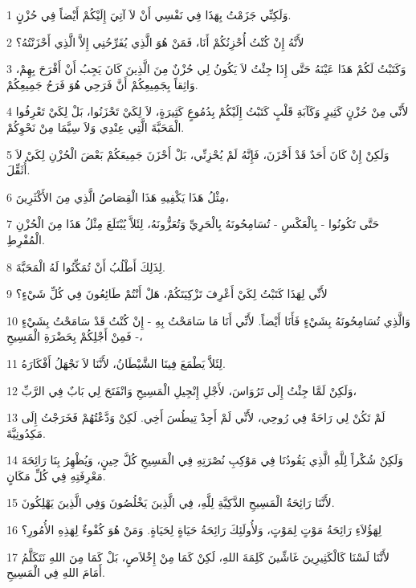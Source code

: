 \par 1 وَلَكِنِّي جَزَمْتُ بِهَذَا فِي نَفْسِي أَنْ لاَ آتِيَ إِلَيْكُمْ أَيْضاً فِي حُزْنٍ.
\par 2 لأَنَّهُ إِنْ كُنْتُ أُحْزِنُكُمْ أَنَا، فَمَنْ هُوَ الَّذِي يُفَرِّحُنِي إِلاَّ الَّذِي أَحْزَنْتُهُ؟
\par 3 وَكَتَبْتُ لَكُمْ هَذَا عَيْنَهُ حَتَّى إِذَا جِئْتُ لاَ يَكُونُ لِي حُزْنٌ مِنَ الَّذِينَ كَانَ يَجِبُ أَنْ أَفْرَحَ بِهِمْ، وَاثِقاً بِجَمِيعِكُمْ أَنَّ فَرَحِي هُوَ فَرَحُ جَمِيعِكُمْ.
\par 4 لأَنِّي مِنْ حُزْنٍ كَثِيرٍ وَكَآبَةِ قَلْبٍ كَتَبْتُ إِلَيْكُمْ بِدُمُوعٍ كَثِيرَةٍ، لاَ لِكَيْ تَحْزَنُوا، بَلْ لِكَيْ تَعْرِفُوا الْمَحَبَّةَ الَّتِي عِنْدِي وَلاَ سِيَّمَا مِنْ نَحْوِكُمْ.
\par 5 وَلَكِنْ إِنْ كَانَ أَحَدٌ قَدْ أَحْزَنَ، فَإِنَّهُ لَمْ يُحْزِنِّي، بَلْ أَحْزَنَ جَمِيعَكُمْ بَعْضَ الْحُزْنِ لِكَيْ لاَ أُثَقِّلَ.
\par 6 مِثْلُ هَذَا يَكْفِيهِ هَذَا الْقِصَاصُ الَّذِي مِنَ الأَكْثَرِينَ،
\par 7 حَتَّى تَكُونُوا - بِالْعَكْسِ - تُسَامِحُونَهُ بِالْحَرِيِّ وَتُعَزُّونَهُ، لِئَلاَّ يُبْتَلَعَ مِثْلُ هَذَا مِنَ الْحُزْنِ الْمُفْرِطِ.
\par 8 لِذَلِكَ أَطْلُبُ أَنْ تُمَكِّنُوا لَهُ الْمَحَبَّةَ.
\par 9 لأَنِّي لِهَذَا كَتَبْتُ لِكَيْ أَعْرِفَ تَزْكِيَتَكُمْ، هَلْ أَنْتُمْ طَائِعُونَ فِي كُلِّ شَيْءٍ؟
\par 10 وَالَّذِي تُسَامِحُونَهُ بِشَيْءٍ فَأَنَا أَيْضاً. لأَنِّي أَنَا مَا سَامَحْتُ بِهِ - إِنْ كُنْتُ قَدْ سَامَحْتُ بِشَيْءٍ - فَمِنْ أَجْلِكُمْ بِحَضْرَةِ الْمَسِيحِ،
\par 11 لِئَلاَّ يَطْمَعَ فِينَا الشَّيْطَانُ، لأَنَّنَا لاَ نَجْهَلُ أَفْكَارَهُ.
\par 12 وَلَكِنْ لَمَّا جِئْتُ إِلَى تَرُوَاسَ، لأَجْلِ إِنْجِيلِ الْمَسِيحِ وَانْفَتَحَ لِي بَابٌ فِي الرَّبِّ،
\par 13 لَمْ تَكُنْ لِي رَاحَةٌ فِي رُوحِي، لأَنِّي لَمْ أَجِدْ تِيطُسَ أَخِي. لَكِنْ وَدَّعْتُهُمْ فَخَرَجْتُ إِلَى مَكِدُونِيَّةَ.
\par 14 وَلَكِنْ شُكْراً لِلَّهِ الَّذِي يَقُودُنَا فِي مَوْكِبِ نُصْرَتِهِ فِي الْمَسِيحِ كُلَّ حِينٍ، وَيُظْهِرُ بِنَا رَائِحَةَ مَعْرِفَتِهِ فِي كُلِّ مَكَانٍ.
\par 15 لأَنَّنَا رَائِحَةُ الْمَسِيحِ الذَّكِيَّةِ لِلَّهِ، فِي الَّذِينَ يَخْلُصُونَ وَفِي الَّذِينَ يَهْلِكُونَ.
\par 16 لِهَؤُلاَءِ رَائِحَةُ مَوْتٍ لِمَوْتٍ، وَلأُولَئِكَ رَائِحَةُ حَيَاةٍ لِحَيَاةٍ. وَمَنْ هُوَ كُفْوءٌ لِهَذِهِ الأُمُورِ؟
\par 17 لأَنَّنَا لَسْنَا كَالْكَثِيرِينَ غَاشِّينَ كَلِمَةَ اللهِ، لَكِنْ كَمَا مِنْ إِخْلاَصٍ، بَلْ كَمَا مِنَ اللهِ نَتَكَلَّمُ أَمَامَ اللهِ فِي الْمَسِيحِ.

